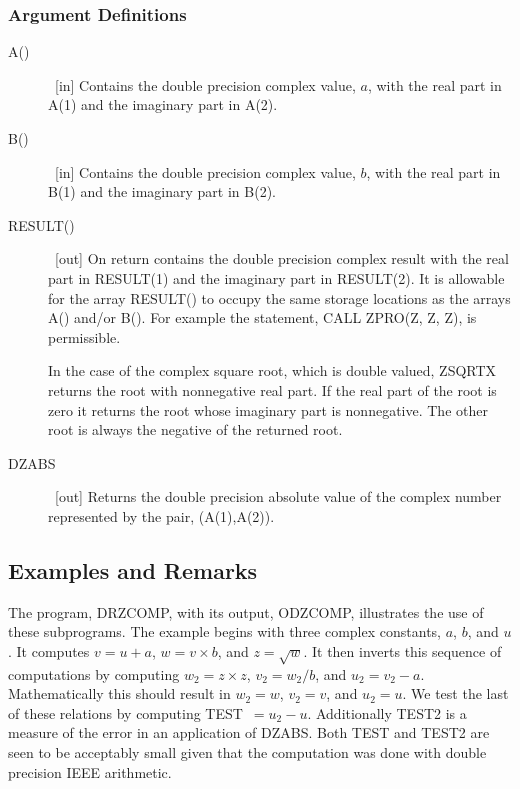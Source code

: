 \documentclass[twoside]{MATH77}
\begin{document}
\subsubsection{Argument Definitions}

\begin{description}

\item[A()] \ [in] Contains the double precision complex value, $a$, with the real part in A(1) and
the imaginary part in A(2).

\item[B()] \ [in] Contains the double precision complex value, $b$, with the real part in B(1)
and the imaginary part in B(2).

\item[RESULT()] \ [out] On return contains the double precision complex result with the real part
in RESULT(1) and the imaginary part in RESULT(2). It is allowable for the
array RESULT() to occupy the same storage locations as the arrays A()
and/or B(). For example the statement, CALL ZPRO(Z, Z, Z), is
permissible.

In the case of the complex square root, which is double valued, ZSQRTX
returns the root with nonnegative real part. If the real part of the root is
zero it returns the root whose imaginary part is nonnegative. The other root
is always the negative of the returned root.

\item[DZABS] \ [out] Returns the double precision absolute value of the complex
number represented by the pair, (A(1),A(2)).

\end{description}

\subsection{Examples and Remarks}

The program, DRZCOMP, with its output, ODZCOMP, illustrates the use of these
subprograms. The example begins with three complex constants, $a$, $b$, and $u$%
. It computes $v = u+a$, $w = v\times b$, and $z = \sqrt w$. It then inverts this
sequence of computations by computing $w_2 = z\times z$, $v_2 = w_2/b$, and $u_2 =
v_2-a$. Mathematically this should result in $w_2 = w$, $v_2 =
v$, and $u_2 = u$. We test the last of these relations by computing TEST\ $=
u_2-u$.  Additionally TEST2 is a measure of the error in an
application of DZABS.  Both TEST and TEST2 are seen to be acceptably
small given that the computation was done with double precision IEEE
arithmetic.
\end{document}
